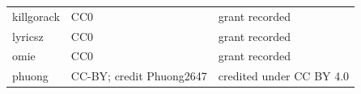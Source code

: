 \begin{longtable}{l>{\raggedright\arraybackslash}p{.40\linewidth}l}
killgorack & %
CC0 & %
grant recorded \\ %

lyricsz & %
CC0 & %
grant recorded \\ %

omie & %
CC0 & %
grant recorded \\ %

phuong & %
CC-BY; credit Phuong2647 & %
credited under CC BY 4.0 \\ %


\end{longtable}
